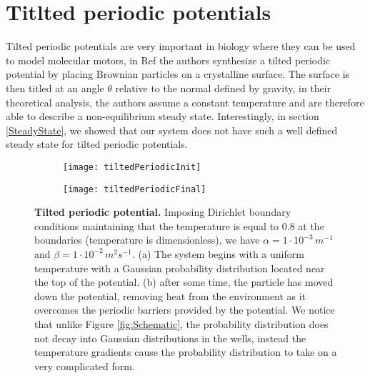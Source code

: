 \section{Titlted periodic potentials}
Tilted periodic potentials are very important in biology where they can be used to model molecular motors, in Ref \cite{MaLaiAckersonEtAl2015, MaLaiAckersonEtAl2015a} the authors synthesize a tilted periodic potential by placing Brownian particles on a crystalline surface. The surface is then titled at an angle $\theta$ relative to the normal defined by gravity, in their theoretical analysis, the authors assume a constant temperature and are therefore able to describe a non-equilibrium steady state. Interestingly, in section \ref{SteadyState}, we showed that our system does not have such a well defined steady state for tilted periodic potentials.

\begin{figure}
	\begin{subfigure}{0.49\textwidth}
		\texttt{[image: tiltedPeriodicInit]}
	\end{subfigure}
	\begin{subfigure}{0.49\textwidth}
		\texttt{[image: tiltedPeriodicFinal]}
	\end{subfigure}
	\caption{\textbf{Tilted periodic potential.} Imposing Dirichlet boundary conditions maintaining that the temperature is equal to 0.8 at the boundaries (temperature is dimensionless), we have $\alpha = 1 \cdot 10^{-3} \, m^{-1}$ and $\beta = 1 \cdot 10^{-2}  \, m^2 s^{-1}$. (a) The system begins with a uniform temperature with a Gaussian probability distribution located near the top of the potential. (b) after some time, the particle has moved down the potential, removing heat from the environment as it overcomes the periodic barriers provided by the potential. We notice that unlike Figure \ref{fig:Schematic}, the probability distribution does not decay into Gaussian distributions in the wells, instead the temperature gradients cause the probability distribution to take on a very complicated form.}
\end{figure}